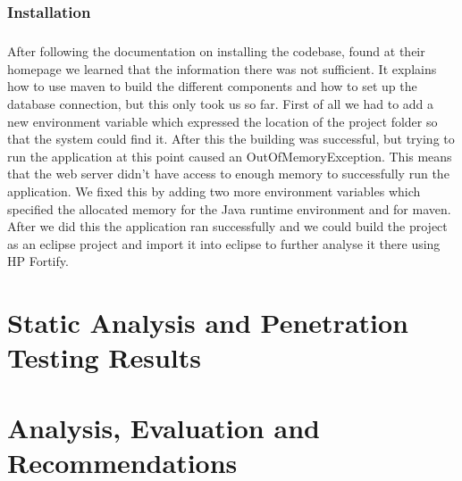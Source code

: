 \documentclass[11pt,english,a4paper]{report}
\begin{document}
\subsection{Installation}
\paragraph{}
After following the documentation on installing the codebase, found at their homepage we learned that the information there was not sufficient.
It explains how to use maven to build the different components and how to set up the database connection, but this only took us so far.
First of all we had to add a new environment variable which expressed the location of the project folder so that the system could find it.
After this the building was successful, but trying to run the application at this point caused an OutOfMemoryException. 
This means that the web server didn't have access to enough memory to successfully run the application. 
We fixed this by adding two more environment variables which specified the allocated memory for the Java runtime environment and for maven.
After we did this the application ran successfully and we could build the project as an eclipse project and import it into eclipse to further analyse it there using HP Fortify.



\chapter{Static Analysis and Penetration Testing Results}
\chapter{Analysis, Evaluation and Recommendations}

\newpage




\end{document}
